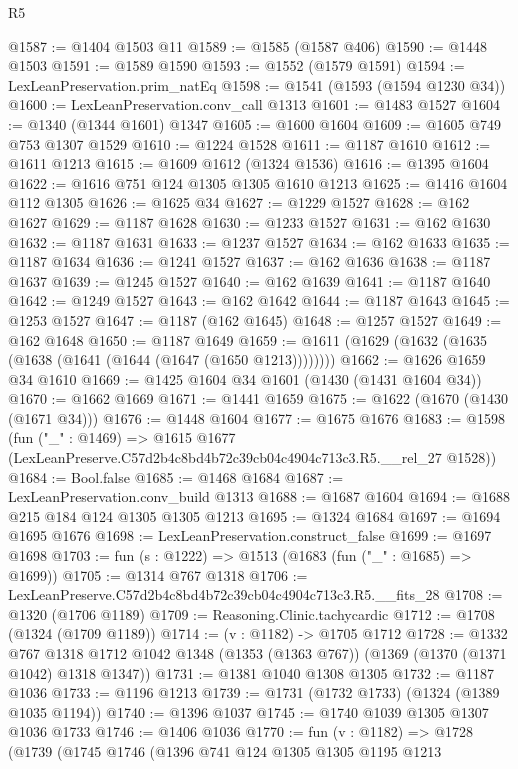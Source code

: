 \begin{lexlean}{R5}
\begin{coremodule}
@1587 := @1404 @1503 @11
@1589 := @1585 (@1587 @406)
@1590 := @1448 @1503
@1591 := @1589 @1590
@1593 := @1552 (@1579 @1591)
@1594 := LexLeanPreservation.prim_natEq
@1598 := @1541 (@1593 (@1594 @1230 @34))
@1600 := LexLeanPreservation.conv_call @1313
@1601 := @1483 @1527
@1604 := @1340 (@1344 @1601) @1347
@1605 := @1600 @1604
@1609 := @1605 @749 @753 @1307 @1529
@1610 := @1224 @1528
@1611 := @1187 @1610
@1612 := @1611 @1213
@1615 := @1609 @1612 (@1324 @1536)
@1616 := @1395 @1604
@1622 := @1616 @751 @124 @1305 @1305 @1610 @1213
@1625 := @1416 @1604 @112 @1305
@1626 := @1625 @34
@1627 := @1229 @1527
@1628 := @162 @1627
@1629 := @1187 @1628
@1630 := @1233 @1527
@1631 := @162 @1630
@1632 := @1187 @1631
@1633 := @1237 @1527
@1634 := @162 @1633
@1635 := @1187 @1634
@1636 := @1241 @1527
@1637 := @162 @1636
@1638 := @1187 @1637
@1639 := @1245 @1527
@1640 := @162 @1639
@1641 := @1187 @1640
@1642 := @1249 @1527
@1643 := @162 @1642
@1644 := @1187 @1643
@1645 := @1253 @1527
@1647 := @1187 (@162 @1645)
@1648 := @1257 @1527
@1649 := @162 @1648
@1650 := @1187 @1649
@1659 := @1611 (@1629 (@1632 (@1635 (@1638 (@1641 (@1644 (@1647 (@1650 @1213))))))))
@1662 := @1626 @1659 @34 @1610
@1669 := @1425 @1604 @34 @1601 (@1430 (@1431 @1604 @34))
@1670 := @1662 @1669
@1671 := @1441 @1659
@1675 := @1622 (@1670 (@1430 (@1671 @34)))
@1676 := @1448 @1604
@1677 := @1675 @1676
@1683 := @1598
    (fun ("_" : @1469) =>
    @1615 @1677 (LexLeanPreserve.C57d2b4c8bd4b72c39cb04c4904c713c3.R5.__rel_27 @1528))
@1684 := Bool.false
@1685 := @1468 @1684
@1687 := LexLeanPreservation.conv_build @1313
@1688 := @1687 @1604
@1694 := @1688 @215 @184 @124 @1305 @1305 @1213
@1695 := @1324 @1684
@1697 := @1694 @1695 @1676
@1698 := LexLeanPreservation.construct_false
@1699 := @1697 @1698
@1703 := fun (s : @1222) => @1513 (@1683 (fun ("_" : @1685) => @1699))
@1705 := @1314 @767 @1318
@1706 := LexLeanPreserve.C57d2b4c8bd4b72c39cb04c4904c713c3.R5.__fits_28
@1708 := @1320 (@1706 @1189)
@1709 := Reasoning.Clinic.tachycardic
@1712 := @1708 (@1324 (@1709 @1189))
@1714 := (v : @1182) -> @1705 @1712
@1728 := @1332
    @767
    @1318
    @1712
    @1042
    @1348
    (@1353 (@1363 @767))
    (@1369 (@1370 (@1371 @1042) @1318 @1347))
@1731 := @1381 @1040 @1308 @1305
@1732 := @1187 @1036
@1733 := @1196 @1213
@1739 := @1731 (@1732 @1733) (@1324 (@1389 @1035 @1194))
@1740 := @1396 @1037
@1745 := @1740 @1039 @1305 @1307 @1036 @1733
@1746 := @1406 @1036
@1770 := fun (v : @1182) =>
  @1728
    (@1739
      (@1745
        @1746
        (@1396
          @741
          @124
          @1305
          @1305
          @1195
          @1213

\end{coremodule}
\end{lexlean}
